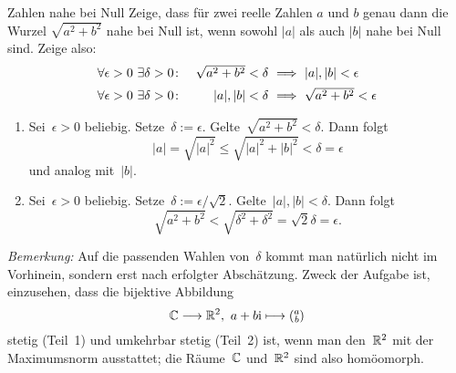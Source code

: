 \documentclass{algblatt}
\begin{document}
\begin{aufgabe}{Zahlen nahe bei Null}
Zeige, dass für zwei reelle Zahlen $a$ und $b$ genau dann die Wurzel
$\sqrt{a^2 + b^2}$ nahe bei Null ist, wenn sowohl $|a|$ als auch $|b|$
nahe bei Null sind. Zeige also:
\[ \begin{array}{@{}rr@{\ }c@{\ }l@{}}
  \forall \epsilon > 0\ \exists \delta > 0 \colon &
        \sqrt{a^2 + b^2} < \delta & \implies & |a|, |b| < \epsilon \\[0.5em]
    \forall \epsilon > 0\ \exists \delta > 0 \colon &
        |a|, |b| < \delta & \implies & \sqrt{a^2  + b^2} < \epsilon
\end{array} \]
\vspace{-1.0em}
\begin{loesung}
\begin{enumerate}
\item Sei~$\epsilon > 0$ beliebig. Setze~$\delta := \epsilon$. Gelte~$\sqrt{a^2
+ b^2} < \delta$. Dann folgt
\[ |a| = \sqrt{|a|^2} \leq \sqrt{|a|^2 + |b|^2} < \delta = \epsilon \]
und analog mit~$|b|$.
\item Sei~$\epsilon > 0$ beliebig. Setze~$\delta := \epsilon/\sqrt{2}$.
Gelte~$|a|,|b| < \delta$. Dann folgt
\[ \sqrt{a^2 + b^2} < \sqrt{\delta^2 + \delta^2} = \sqrt{2} \delta = \epsilon. \]
\end{enumerate}
\emph{Bemerkung:} Auf die passenden Wahlen von~$\delta$ kommt man natürlich
nicht im Vorhinein, sondern erst nach erfolgter Abschätzung. Zweck der Aufgabe
ist, einzusehen, dass die bijektive Abbildung
\[ \mathbb{C} \longrightarrow \mathbb{R}^2,\ a+b\mathrm{i} \longmapsto
\left(\!\begin{smallmatrix}a\\b\end{smallmatrix}\!\right) \]
stetig (Teil~1) und umkehrbar stetig (Teil~2) ist, wenn man den~$\mathbb{R}^2$ mit der
Maximumsnorm ausstattet; die Räume~$\mathbb{C}$ und~$\mathbb{R}^2$ sind also homöomorph.
\end{loesung}
\end{aufgabe}
\end{document}

